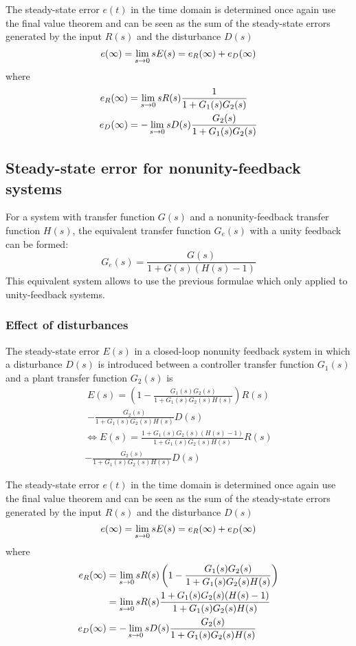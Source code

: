 \documentclass[10pt, twocolumn]{article}
\begin{document}
The steady-state error \(e(t)\) in the time domain is determined once again use the final value theorem and can be seen as the sum of the steady-state errors generated by the input \(R(s)\) and the disturbance \(D(s)\)
\[
  e(\infty) = \lim_{s \to 0}{sE(s)} = e_R(\infty) + e_D(\infty)
\]
where
\begin{align*}
  e_R(\infty) & = \lim_{s \to 0}{sR(s) \frac{1}{1 + G_1(s)G_2(s)}}       \\
  e_D(\infty) & = -\lim_{s \to 0}{sD(s) \frac{G_2(s)}{1 + G_1(s)G_2(s)}}
\end{align*}


\subsection{Steady-state error for nonunity-feedback systems}
For a system with transfer function \(G(s)\) and a nonunity-feedback transfer function \(H(s)\), the equivalent transfer function \(G_e(s)\) with a unity feedback can be formed:
\[
  G_e(s) = \frac{G(s)}{1 + G(s)(H(s) - 1)}
\]
This equivalent system allows to use the previous formulae which only applied to unity-feedback systems.


\subsubsection{Effect of disturbances}
The steady-state error \(E(s)\) in a closed-loop nonunity feedback system in which a disturbance \(D(s)\) is introduced between a controller transfer function \(G_1(s)\) and a plant transfer function \(G_2(s)\) is
\begin{multline*}
  E(s) = \left( 1 - \frac{G_1(s)G_2(s)}{1 + G_1(s)G_2(s)H(s)} \right) R(s) \\
  - \frac{G_2(s)}{1 + G_1(s)G_2(s)H(s)} D(s)
\end{multline*}
\begin{multline*}
  \iff E(s) = \frac{1 + G_1(s)G_2(s)(H(s) - 1)}{1 + G_1(s)G_2(s)H(s)} R(s) \\
  - \frac{G_2(s)}{1 + G_1(s)G_2(s)H(s)} D(s)
\end{multline*}

The steady-state error \(e(t)\) in the time domain is determined once again use the final value theorem and can be seen as the sum of the steady-state errors generated by the input \(R(s)\) and the disturbance \(D(s)\)
\[
  e(\infty) = \lim_{s \to 0}{sE(s)} = e_R(\infty) + e_D(\infty)
\]
where
\begin{align*}
  e_R(\infty) & = \lim_{s \to 0}{sR(s) \left( 1 - \frac{G_1(s)G_2(s)}{1 + G_1(s)G_2(s)H(s)} \right)} \\
              & = \lim_{s \to 0}{sR(s) \frac{1 + G_1(s)G_2(s)(H(s) - 1)}{1 + G_1(s)G_2(s)H(s)}}      \\
  e_D(\infty) & = -\lim_{s \to 0}{sD(s) \frac{G_2(s)}{1 + G_1(s)G_2(s)H(s)}}
\end{align*}
\end{document}
